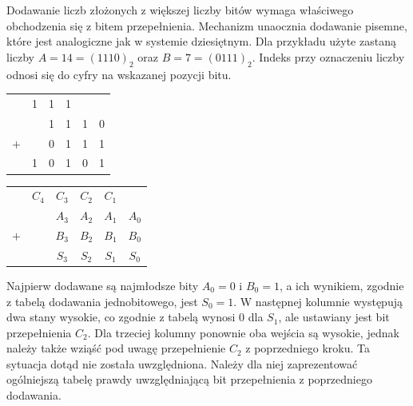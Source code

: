 \documentclass[a4paper,12pt]{article}
\begin{document}
Dodawanie liczb złożonych z większej liczby bitów wymaga właściwego obchodzenia się z bitem przepełnienia. Mechanizm unaocznia dodawanie pisemne, które jest analogiczne jak w systemie dziesiętnym. Dla przykładu użyte zastaną liczby $A = 14 = (1110)_2$ oraz $B = 7 = (0111)_2$. Indeks przy oznaczeniu liczby odnosi się do cyfry na wskazanej pozycji bitu.

\begin{table}[h!]
\centering

\begin{minipage}{5.5cm}
\centering

\begin{tabular}{  c  c  c  c  c  c  }
      & 1 & 1 & 1 &   &   \\
      &   & 1 & 1 & 1 & 0 \\
  $+$ &   & 0 & 1 & 1 & 1 \\
  \hline
      & 1 & 0 & 1 & 0 & 1 \\
\end{tabular}
\end{minipage}
\begin{minipage}{11cm}
\begin{tabular}{  c  c  c  c  c  c  }
      & $C_4$ & $C_3$ & $C_2$ & $C_1$ &       \\
      &       & $A_3$ & $A_2$ & $A_1$ & $A_0$ \\
  $+$ &       & $B_3$ & $B_2$ & $B_1$ & $B_0$ \\
  \hline
      &       & $S_3$ & $S_2$ & $S_1$ & $S_0$ \\
\end{tabular}
\end{minipage}
\end{table}

Najpierw dodawane są najmłodsze bity $A_0 = 0$ i $B_0 = 1$, a ich wynikiem, zgodnie z tabelą dodawania jednobitowego, jest $S_0 = 1$. W następnej kolumnie występują dwa stany wysokie, co zgodnie z tabelą wynosi $0$ dla $S_1$, ale ustawiany jest bit przepełnienia $C_2$. Dla trzeciej kolumny ponownie oba wejścia są wysokie, jednak należy także wziąść pod uwagę przepełnienie $C_2$ z poprzedniego kroku. Ta sytuacja dotąd nie została uwzględniona. Należy dla niej zaprezentować ogólniejszą tabelę prawdy uwzględniającą bit przepełnienia z poprzedniego dodawania.
\end{document}
